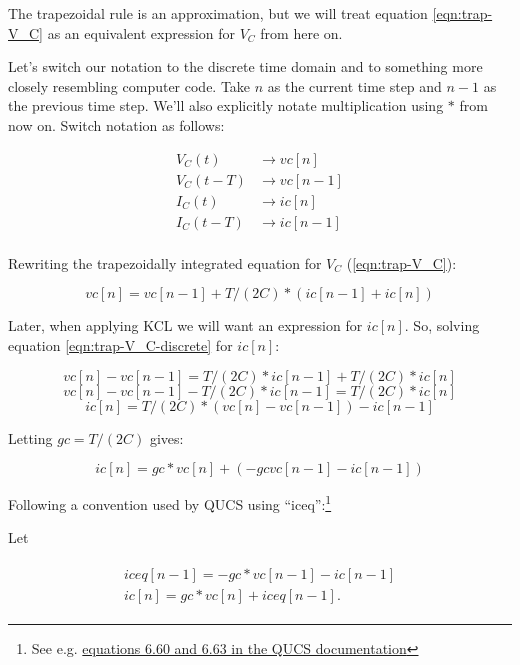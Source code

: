 \documentclass{article}
\begin{document}
The trapezoidal rule is an approximation, but we will treat equation \ref{eqn:trap-V_C} as an equivalent expression for $V_C$ from here on.

Let's switch our notation to the discrete time domain and to something
more closely resembling computer code.
Take $n$ as the current time step and $n-1$ as the previous time step.
We'll also explicitly notate multiplication using $*$ from now on.
Switch notation as follows:

\begin{align*}
V_C(t) &\to vc[n] \\
V_C(t-T) &\to vc[n-1] \\
I_C(t) &\to ic[n] \\
I_C(t-T) &\to ic[n-1] \\
\end{align*}

Rewriting the trapezoidally integrated equation for $V_C$ (\ref{eqn:trap-V_C}):

\begin{equation}
\label{eqn:trap-V_C-discrete}
vc[n] = vc[n-1] + T/(2C) * ( ic[n-1] + ic[n] )
\end{equation}

Later, when applying KCL we will want an expression for $ic[n]$. So,
	solving equation \ref{eqn:trap-V_C-discrete} for $ic[n]$:

\begin{equation}
vc[n] - vc[n-1] = T/(2C) * ic[n-1] + T/(2C) *  ic[n]
\end{equation}
\begin{equation}
vc[n] - vc[n-1] - T/(2C) * ic[n-1] = T/(2C) * ic[n]
\end{equation}
\begin{equation}
ic[n] = T/(2C) * (vc[n] - vc[n-1]) - ic[n-1]
\end{equation}

Letting $gc = T/(2C)$ gives:

\begin{equation}
ic[n] = gc * vc[n] + (- gc vc[n-1] - ic[n-1])
\end{equation}

Following a convention used by QUCS using ``iceq'':\footnote{
	See e.g. \href{http://qucs.sourceforge.net/tech/node26.html#SECTION00731000000000000000}{equations 6.60 and 6.63 in the QUCS documentation}}

Let

\begin{eqnarray} \begin{array}{l}
iceq[n-1] = - gc * vc[n-1] - ic[n-1]\\
ic[n] = gc * vc[n] + iceq[n-1].
\end{array} \end{eqnarray}
\end{document}
